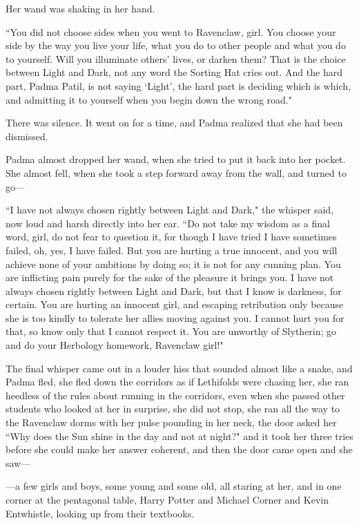 Her wand was shaking in her hand.

``You did not choose sides when you went to Ravenclaw, girl. You choose your side by the way you live your life, what you do to other people and what you do to yourself. Will you illuminate others' lives, or darken them? That is the choice between Light and Dark, not any word the Sorting Hat cries out. And the hard part, Padma Patil, is not saying `Light', the hard part is deciding which is which, and admitting it to yourself when you begin down the wrong road."

There was silence. It went on for a time, and Padma realized that she had been dismissed.

Padma almost dropped her wand, when she tried to put it back into her pocket. She almost fell, when she took a step forward away from the wall, and turned to go---

``I have not always chosen rightly between Light and Dark," the whisper said, now loud and harsh directly into her ear. ``Do not take my wisdom as a final word, girl, do not fear to question it, for though I have tried I have sometimes failed, oh, yes, I have failed. But you are hurting a true innocent, and you will achieve none of your ambitions by doing so; it is not for any cunning plan. You are inflicting pain purely for the sake of the pleasure it brings you. I have not always chosen rightly between Light and Dark, but that I know is darkness, for certain. You are hurting an innocent girl, and escaping retribution only because she is too kindly to tolerate her allies moving against you. I cannot hurt you for that, so know only that I cannot respect it. You are unworthy of Slytherin; go and do your Herbology homework, Ravenclaw girl!"

The final whisper came out in a louder hiss that sounded almost like a snake, and Padma fled, she fled down the corridors as if Lethifolds were chasing her, she ran heedless of the rules about running in the corridors, even when she passed other students who looked at her in surprise, she did not stop, she ran all the way to the Ravenclaw dorms with her pulse pounding in her neck, the door asked her ``Why does the Sun shine in the day and not at night?" and it took her three tries before she could make her answer coherent, and then the door came open and she saw---

---a few girls and boys, some young and some old, all staring at her, and in one corner at the pentagonal table, Harry Potter and Michael Corner and Kevin Entwhistle, looking up from their textbooks.


